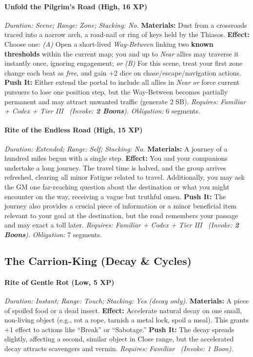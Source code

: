\paragraph{Unfold the Pilgrim's Road (High, 16 XP)} \emph{Duration: Scene; Range: Zone; Stacking: No.}
\textbf{Materials:} Dust from a crossroads traced into a narrow arch, a road-nail or ring of keys held by the Thiasos.
\textbf{Effect:} Choose one:
\emph{(A)} Open a short-lived \emph{Way-Between} linking two \textbf{known thresholds} within the current map; you and up to \emph{Near} allies may traverse it instantly once, ignoring engagement; \emph{or}
\emph{(B)} For this scene, treat your first zone change each beat as \emph{free}, and gain +2 dice on chase/escape/navigation actions.
\textbf{Push It:} Either extend the portal to include all allies in \emph{Near} \emph{or} force current pursuers to lose one position step, but the Way-Between becomes partially permanent and may attract unwanted traffic (generate 2 SB).
\emph{Requires: Familiar + Codex + Tier III \ (\textit{Invoke:} \textbf{2 Boons}).}
\emph{Obligation:} 6 segments.

\paragraph{Rite of the Endless Road (High, 15 XP)} \emph{Duration: Extended; Range: Self; Stacking: No.}
\textbf{Materials:} A journey of a hundred miles begun with a single step.
\textbf{Effect:} You and your companions undertake a long journey. The travel time is halved, and the group arrives refreshed, clearing all minor Fatigue related to travel. Additionally, you may ask the GM one far-reaching question about the destination or what you might encounter on the way, receiving a vague but truthful omen.
\textbf{Push It:} The journey also provides a crucial piece of information or a minor beneficial item relevant to your goal at the destination, but the road remembers your passage and may exact a toll later.
\emph{Requires: Familiar + Codex + Tier III \ (\textit{Invoke:} \textbf{2 Boons}).}
\emph{Obligation:} 7 segments.

\subsection{The Carrion-King (Decay \& Cycles)}
\paragraph{Rite of Gentle Rot (Low, 5 XP)} \emph{Duration: Instant; Range: Touch; Stacking: Yes (decay only).}
\textbf{Materials:} A piece of spoiled food or a dead insect.
\textbf{Effect:} Accelerate natural decay on one small, non-living object (e.g., rot a rope, tarnish a metal lock, spoil a meal). This grants +1 effect to actions like ``Break'' or ``Sabotage.''
\textbf{Push It:} The decay spreads slightly, affecting a second, similar object in Close range, but the accelerated decay attracts scavengers and vermin.
\emph{Requires: Familiar \ (\textit{Invoke:} 1 Boon).}
